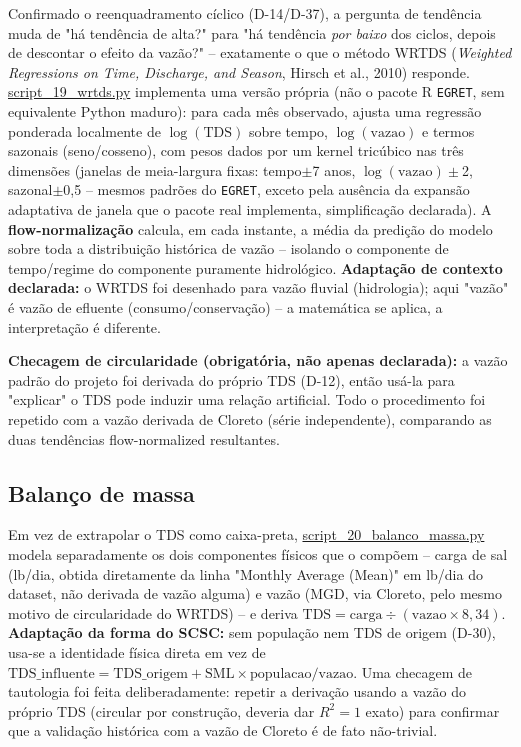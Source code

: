 Confirmado o reenquadramento cíclico (D-14/D-37), a pergunta de tendência muda de "há tendência de alta?" para "há tendência \textit{por baixo} dos ciclos, depois de descontar o efeito da vazão?" -- exatamente o que o método WRTDS (\textit{Weighted Regressions on Time, Discharge, and Season}, Hirsch et al., 2010) responde. \url{script_19_wrtds.py} implementa uma versão própria (não o pacote R \texttt{EGRET}, sem equivalente Python maduro): para cada mês observado, ajusta uma regressão ponderada localmente de $\log(\mathrm{TDS})$ sobre tempo, $\log(\mathrm{vazao})$ e termos sazonais (seno/cosseno), com pesos dados por um kernel tricúbico nas três dimensões (janelas de meia-largura fixas: tempo$\pm$7 anos, $\log(\mathrm{vazao})\pm$2, sazonal$\pm$0,5 -- mesmos padrões do \texttt{EGRET}, exceto pela ausência da expansão adaptativa de janela que o pacote real implementa, simplificação declarada). A \textbf{flow-normalização} calcula, em cada instante, a média da predição do modelo sobre toda a distribuição histórica de vazão -- isolando o componente de tempo/regime do componente puramente hidrológico. \textbf{Adaptação de contexto declarada:} o WRTDS foi desenhado para vazão fluvial (hidrologia); aqui "vazão" é vazão de efluente (consumo/conservação) -- a matemática se aplica, a interpretação é diferente.

\textbf{Checagem de circularidade (obrigatória, não apenas declarada):} a vazão padrão do projeto foi derivada do próprio TDS (D-12), então usá-la para "explicar" o TDS pode induzir uma relação artificial. Todo o procedimento foi repetido com a vazão derivada de Cloreto (série independente), comparando as duas tendências flow-normalized resultantes.

\subsection{Balanço de massa}

Em vez de extrapolar o TDS como caixa-preta, \url{script_20_balanco_massa.py} modela separadamente os dois componentes físicos que o compõem -- carga de sal (lb/dia, obtida diretamente da linha "Monthly Average (Mean)" em lb/dia do dataset, não derivada de vazão alguma) e vazão (MGD, via Cloreto, pelo mesmo motivo de circularidade do WRTDS) -- e deriva $\mathrm{TDS} = \mathrm{carga} \div (\mathrm{vazao} \times 8{,}34)$. \textbf{Adaptação da forma do SCSC:} sem população nem TDS de origem (D-30), usa-se a identidade física direta em vez de $\mathrm{TDS\_influente} = \mathrm{TDS\_origem} + \mathrm{SML} \times \mathrm{populacao} / \mathrm{vazao}$. Uma checagem de tautologia foi feita deliberadamente: repetir a derivação usando a vazão do próprio TDS (circular por construção, deveria dar $R^2=1$ exato) para confirmar que a validação histórica com a vazão de Cloreto é de fato não-trivial.

